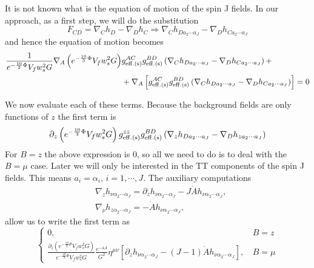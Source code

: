 \documentclass[10 pt]{article}
\begin{document}
It is not known what is the equation of motion of the spin J fields. In our approach, as a first step, we will do the substitution
\begin{equation}
F_{CD} = \nabla_C h_D - \nabla_D h_C \Rightarrow \nabla_C h_{D a_2 \cdots a_J} - \nabla_D h_{C a_2 \cdots a_J}
\label{eq:spin_j_sub}
\end{equation}
and  hence the equation of motion becomes
\begin{align}
\frac{1}{e^{-\frac{10}{3} \Phi} V_f w_s^2 G}\nabla_A \left(e^{-\frac{10}{3} \Phi} V_f w_s^2 G \right)&g^{AC}_{\rm{eff. (s)}}g^{BD}_{\rm{eff. (s)}}\left(\nabla_C h_{D a_2 \cdots a_J} - \nabla_D h_{C a_2 \cdots a_J}\right) + \notag \\
&+\nabla_A \left[g^{AC}_{\rm{eff. (s)}}g^{BD}_{\rm{eff. (s)}}\left(\nabla_C h_{D a_2 \cdots a_J} - \nabla_D h_{C a_2 \cdots a_J}\right)\right] = 0
\label{eq:spin_J_eom_cov_term}
\end{align}

We now evaluate each of these terms. Because the background fields are only functions of $z$ the first term is
\begin{equation}
\partial_z\left( e^{-\frac{10}{3} \Phi} V_f w_s^2 G \right) g^{zz}_{\rm{eff. (s)}}g^{BD}_{\rm{eff. (s)}}\left(\nabla_z h_{D a_2 \cdots a_J} - \nabla_D h_{z a_2 \cdots a_J}\right)
\label{eq:spin_j_eom_first_term}
\end{equation}
For $B = z$ the above expression is 0, so all we need to do is to deal with the $B=\mu$ case. Later we will only be interested in the TT components of the spin J fields. This means $a_i = \alpha_i, \, i = 1,\cdots, J$.
The auxiliary computations
\begin{align}
& \nabla_z h_{\nu \alpha_2 \cdots \alpha_J} = \partial_z h_{\nu \alpha_2 \cdots \alpha_J} - J \dot{A} h_{\nu \alpha_2 \cdots \alpha_J}, \\
& \nabla_\nu h_{z \alpha_2 \cdots \alpha_J} = - \dot{A} h_{\nu \alpha_2 \cdots \alpha_J},
\label{eq:spin_J_cod_id_1}
\end{align}
allow us to write the first term as
\begin{equation}
\begin{cases}
0, & B = z \\
\frac{\partial_{z}\left( e^{-\frac{10}{3} \Phi} V_f w_s^2 G \right)}{ e^{-\frac{10}{3} \Phi} V_f w_s^2 G} \frac{e^{-4A}}{G^2} \eta^{\mu \nu} \left[ \partial_z h_{\nu \alpha_2 \cdots \alpha_J} - \left(J-1\right) \dot{A} h_{\nu \alpha_2 \cdots \alpha_J} \right], \, &B = \mu
\end{cases}
\end{equation}
\end{document}
